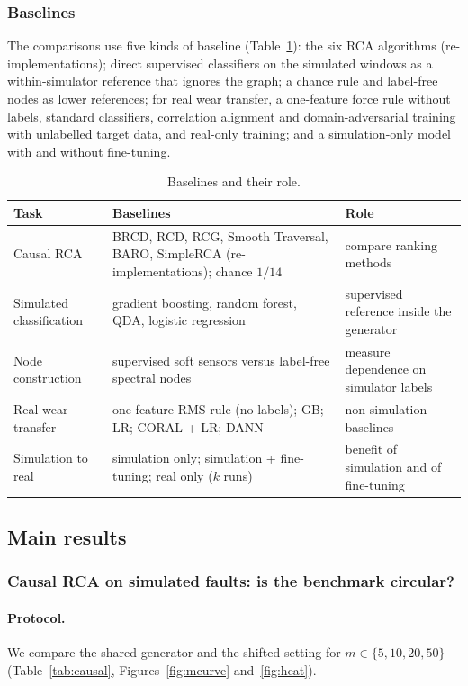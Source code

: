 \documentclass[11pt]{article}
\begin{document}
\subsubsection{Baselines}
The comparisons use five kinds of baseline (Table~\ref{tab:baselines}): the six RCA algorithms (re-implementations); direct supervised classifiers on the simulated windows as a within-simulator reference that ignores the graph; a chance rule and label-free nodes as lower references; for real wear transfer, a one-feature force rule without labels, standard classifiers, correlation alignment and domain-adversarial training with unlabelled target data, and real-only training; and a simulation-only model with and without fine-tuning.
\begin{table}[t]\centering\small
\caption{Baselines and their role.}\label{tab:baselines}
\begin{tabular}{p{3.8cm}p{5.3cm}p{5.1cm}}\toprule
Task & Baselines & Role\\\midrule
Causal RCA & BRCD, RCD, RCG, Smooth Traversal, BARO, SimpleRCA (re-implementations); chance $1/14$ & compare ranking methods\\
Simulated classification & gradient boosting, random forest, QDA, logistic regression & supervised reference inside the generator\\
Node construction & supervised soft sensors versus label-free spectral nodes & measure dependence on simulator labels\\
Real wear transfer & one-feature RMS rule (no labels); GB; LR; CORAL + LR; DANN & non-simulation baselines\\
Simulation to real & simulation only; simulation + fine-tuning; real only ($k$ runs) & benefit of simulation and of fine-tuning\\\bottomrule
\end{tabular}
\end{table}

\subsection{Main results}\label{sec:main}
\subsubsection{Causal RCA on simulated faults: is the benchmark circular?}\label{sec:circ}
\paragraph{Protocol.} We compare the shared-generator and the shifted setting for $m\in\{5,10,20,50\}$ (Table~\ref{tab:causal}, Figures~\ref{fig:mcurve} and~\ref{fig:heat}).
\begin{table}[t]\centering\small
\caption{Causal RCA: top-1 accuracy $\uparrow$ (mean over 5 root causes; 100 draws per fault) versus the number of anomalous samples $m$; best per column in bold.}\label{tab:causal}

\end{table}
\end{document}
